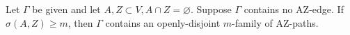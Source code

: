 Let $\Gamma$ be given and let $A, Z \subset V, A \cap Z = \varnothing$. Suppose $\Gamma$ contains no AZ-edge. If $\sigma(A, Z) \geq m$, then $\Gamma$ contains an openly-disjoint $m$-family of AZ-paths.
